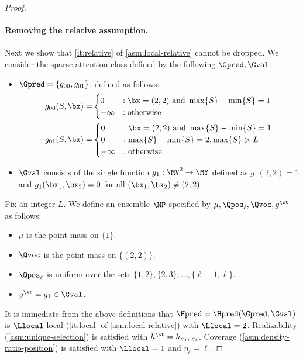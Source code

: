 \documentclass{article}
\begin{document}
\begin{proof}
  \paragraph{Removing the relative assumption.} Next we show that \cref{it:relative} of \cref{asm:local-relative} cannot be dropped. We consider the sparse attention class defined by the following $\Gpred, \Gval$:
  \begin{itemize}
\item $\Gpred= \{ g_{00}, g_{01} \}$, defined as follows:
  \begin{align}
    g_{00}(S, \bx) =& \begin{cases}
      0 &: \bx = (2,2) \mbox{ and } \max\{ S \} - \min\{S \} = 1 \\
      -\infty &: \mbox{otherwise}
    \end{cases}\nonumber\\
    g_{01}(S, \bx) =& \begin{cases}
      0& : \bx =(2,2) \mbox{ and }\max\{S \} - \min\{S \} = 1 \\
      0 &: \max\{ S \} - \min\{S \} = 2, \max\{S \} > L \\
      -\infty &: \mbox{otherwise}.
      \end{cases}\nonumber
  \end{align}
\item $\Gval$ consists of the single function $g_1 : \MV^2 \to \MY$ defined as $g_1(2,2) = 1$ and $g_1(\bx_1, \bx_2) = 0$ for all $(\bx_1, \bx_2) \neq (2,2)$. 
\end{itemize}
Fix an integer $L$. We define an ensemble $\MP$ specified by $\mu, \Qpos_\ell, \Qvoc, g^\st$ as follows:
\begin{itemize}
  \item $\mu$ is the point mass on $\{1 \}$. 
  \item $\Qvoc$ is the point mass on $\{ (2,2) \}$. 
  \item $\Qpos_\ell$ is uniform over the sets $\{1, 2\}, \{2,3\}, \ldots, \{\ell-1, \ell \}$. 
  \item $g^\st = g_{1} \in \Gval$. 
  \end{itemize}
  It is immediate from the above definitions that $\Hpred = \Hpred(\Gpred, \Gval)$ is $\Llocal$-local (\cref{it:local} of \cref{asm:local-relative}) with $\Llocal = 2$. Realizability (\cref{asm:unique-selection}) is satisfied with $h^\st = h_{g_{00}, g_{1}}$. Coverage (\cref{asm:density-ratio-position}) is satisfied with $\Llocal = 1$ and $\eta_\ell = \ell$.


\end{proof}
\end{document}
